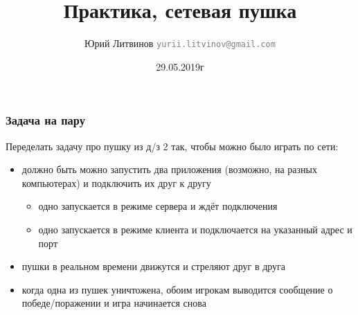 \documentclass[xetex,mathserif,serif]{beamer}
\title{Практика, сетевая пушка}
\author[Юрий Литвинов]{Юрий Литвинов \newline \textcolor{gray}{\small\texttt{yurii.litvinov@gmail.com}}}
\date{29.05.2019г}
\begin{document}
	
	\frame{\titlepage}

	\begin{frame}
		\frametitle{Задача на пару}
		Переделать задачу про пушку из д/з 2 так, чтобы можно было играть по сети:
		\begin{itemize}
			\item должно быть можно запустить два приложения (возможно, на разных компьютерах) и подключить их друг к другу
			\begin{itemize}
				\item одно запускается в режиме сервера и ждёт подключения
				\item одно запускается в режиме клиента и подключается на указанный адрес и порт
			\end{itemize}
			\item пушки в реальном времени движутся и стреляют друг в друга
			\item когда одна из пушек уничтожена, обоим игрокам выводится сообщение о победе/поражении и игра начинается снова
		\end{itemize}
	\end{frame}
\end{document}
